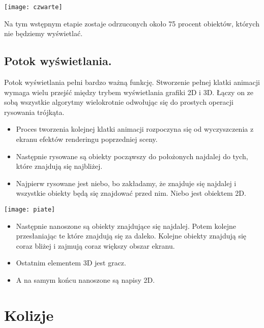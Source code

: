 \documentclass[licencjacka]{pracamgr}
\begin{document}
\begin{center}
\texttt{[image: czwarte]}
\end{center}

Na tym wstępnym etapie zostaje odrzuconych około 75 procent
obiektów, których nie będziemy wyświetlać.

\section{Potok wyświetlania.}

Potok wyświetlania pełni bardzo ważną funkcję. Stworzenie pełnej klatki animacji wymaga wielu przejść między trybem wyświetlania grafiki 2D i 3D. Łączy on ze sobą wszystkie algorytmy wielokrotnie odwołując się do prostych operacji rysowania trójkąta.

\begin{itemize}
    \item Proces tworzenia kolejnej klatki animacji rozpoczyna się od wyczyszczenia z ekranu efektów renderingu poprzedniej sceny.
    \item Następnie rysowane są obiekty począwszy do położonych najdalej do tych, które znajdują się najbliżej.
    \item Najpierw rysowane jest niebo, bo zakładamy, że znajduje się najdalej i wszystkie obiekty będą się znajdować przed nim. Niebo jest obiektem 2D.
\end{itemize}

\begin{center}
\texttt{[image: piate]}
\end{center}

\begin{itemize}
    \item Następnie nanoszone są obiekty znajdujące się najdalej. Potem kolejne przesłaniając te które znajdują się za daleko. Kolejne obiekty znajdują się coraz bliżej i zajmują coraz większy obszar ekranu.
  \item Ostatnim elementem 3D jest gracz.
  \item A na samym końcu nanoszone są napisy 2D.

\end{itemize}






\chapter{Kolizje}\label{r:losers}
\end{document}
